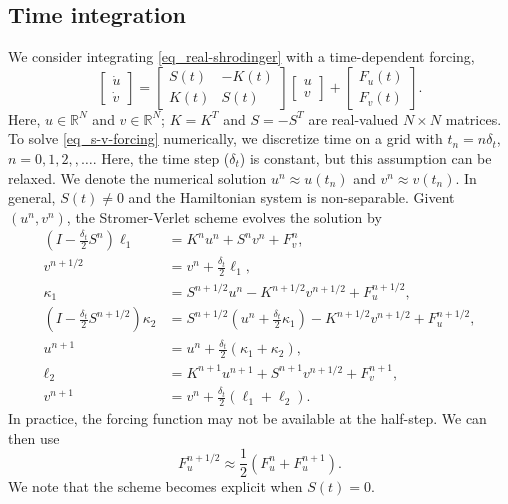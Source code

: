\documentclass[11pt]{article}
\begin{document}
\subsection{Time integration}
We consider integrating \eqref{eq_real-shrodinger} with a time-dependent forcing,
\begin{equation}\label{eq_s-v-forcing}
  \begin{bmatrix} \dot{u}\\ \dot{v} \end{bmatrix} =
%
  \begin{bmatrix}
    S(t) & -K(t) \\ K(t) & S(t)
  \end{bmatrix}     
  \begin{bmatrix} u\\ v \end{bmatrix}
  + \begin{bmatrix} F_u(t) \\ F_v(t) \end{bmatrix}.
\end{equation}
Here, $u\in \mathbb{R}^N$ and $v\in \mathbb{R}^N$; $K=K^T$ and $S=-S^T$ are real-valued $N\times N$
matrices.  To solve \eqref{eq_s-v-forcing} numerically, we discretize time on a grid with $t_n = n
\delta_t$, $n=0,1,2,,\ldots$. Here, the time step ($\delta_t$) is constant, but this assumption can
be relaxed. We denote the numerical solution $u^n\approx u(t_n)$ and $v^n\approx v(t_n)$.  In
general, $S(t)\ne0$ and the Hamiltonian system is non-separable. Givent $(u^n, v^n)$, the 
Stromer-Verlet scheme evolves the solution by
\begin{align*}
  \left(I - \frac{\delta_t}{2} S^{n}\right) \ell_1 &= K^n u^n + S^n v^n + F_v^n,\\
%
  v^{n+1/2} &= v^n + \frac{\delta_t}{2}\ell_1,\\
  \kappa_1 &= S^{n+1/2} u^n - K^{n+1/2} v^{n+1/2} +
  F_u^{n+1/2},\\
%
  \left(I - \frac{\delta_t}{2} S^{n+1/2}\right) \kappa_2 &= S^{n+1/2}\left( u^n + \frac{\delta_t}{2}
  \kappa_1 \right) - K^{n+1/2}  v^{n+1/2} + F_u^{n+1/2},\\
  u^{n+1} &= u^n + \frac{\delta_t}{2}\left( \kappa_1 + \kappa_2 \right),\\
%
  \ell_2 &= K^{n+1} u^{n+1} + S^{n+1}  v^{n+1/2} + F_v^{n+1},\\
  v^{n+1} &= v^n + \frac{\delta_t}{2}\left( \ell_1 + \ell_2 \right).
\end{align*}
In practice, the forcing function may not be available at the half-step. We can then use
\[
F_u^{n+1/2} \approx \frac{1}{2}\left( F_u^{n} + F_u^{n+1}\right).
\]
We note that the scheme becomes explicit when $S(t)=0$. 
\end{document}
